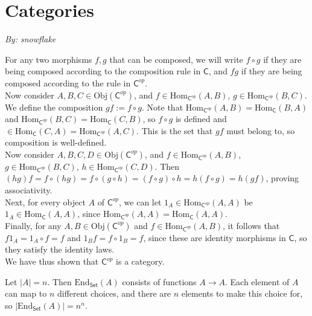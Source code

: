 \section{Categories}
\emph{By: snowflake}

\exercise 

For any two morphisms $f,g$ that can be composed, we will write $f \circ g$ if they are being composed according to the composition rule in $\textsf{C}$, and $fg$ if they are being composed according to the rule in $\textsf{C}^{op}$. \\

Now consider $A,B,C \in \text{Obj}(\textsf{C}^{op})$, and $f \in \text{Hom}_{\textsf{C}^{op}}(A,B)$, $g \in \text{Hom}_{\textsf{C}^{op}}(B,C)$. We define the composition $gf := f \circ g$. Note that $\text{Hom}_{\textsf{C}^{op}}(A,B) = \text{Hom}_{\textsf{C}}(B,A)$ and $\text{Hom}_{\textsf{C}^{op}}(B,C) = \text{Hom}_{\textsf{C}}(C,B)$, so $f \circ g$ is defined and $ \in \text{Hom}_{\textsf{C}}(C,A) = \text{Hom}_{\textsf{C}^{op}}(A,C)$. This is the set that $gf$ must belong to, so composition is well-defined. \\

Now consider $A,B,C,D \in \text{Obj}(\textsf{C}^{op})$, and $f \in \text{Hom}_{\textsf{C}^{op}}(A,B)$, $g \in \text{Hom}_{\textsf{C}^{op}}(B,C)$, $h \in \text{Hom}_{\textsf{C}^{op}}(C,D)$. Then $(hg)f = f \circ (hg)= f \circ (g \circ h) = (f \circ g) \circ h = h(f \circ g)=h(gf)$, proving associativity. \\ 

Next, for every object $A$ of $\textsf{C}^{op}$, we can let $1_A \in \text{Hom}_{\textsf{C}^{op}}(A,A)$ be $1_A \in \text{Hom}_{\textsf{C}}(A,A)$, since $\text{Hom}_{\textsf{C}^{op}}(A,A) = \text{Hom}_{\textsf{C}}(A,A)$. \\

Finally, for any $A,B \in \text{Obj}(\textsf{C}^{op})$ and $f \in \text{Hom}_{\textsf{C}^{op}}(A,B)$, it follows that $f1_A = 1_A \circ f = f$ and $1_B f = f \circ 1_B = f$, since these are identity morphisms in $\textsf{C}$, so they satisfy the identity laws. \\

We have thus shown that $\textsf{C}^{op}$ is a category.

\exercise Let $|A| = n$. Then $\text{End}_{\textsf{Set}}(A)$ consists of functions $A \to A$. Each element of $A$ can map to $n$ different choices, and there are $n$ elements to make this choice for, so $|\text{End}_{\textsf{Set}}(A)| = n^n$.

